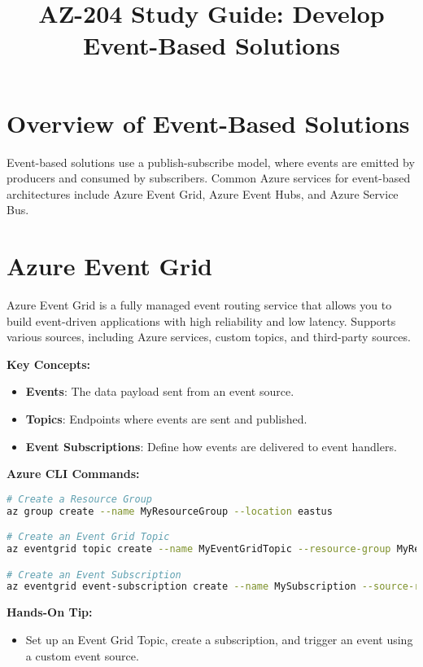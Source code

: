 \documentclass{article}
\title{AZ-204 Study Guide: Develop Event-Based Solutions}
\author{}
\date{}
\begin{document}
\maketitle

\section{Overview of Event-Based Solutions}
Event-based solutions use a publish-subscribe model, where events are emitted by producers and consumed by subscribers. Common Azure services for event-based architectures include Azure Event Grid, Azure Event Hubs, and Azure Service Bus.

\section{Azure Event Grid}
Azure Event Grid is a fully managed event routing service that allows you to build event-driven applications with high reliability and low latency. Supports various sources, including Azure services, custom topics, and third-party sources.

\textbf{Key Concepts:}
\begin{itemize}
    \item \textbf{Events}: The data payload sent from an event source.
    \item \textbf{Topics}: Endpoints where events are sent and published.
    \item \textbf{Event Subscriptions}: Define how events are delivered to event handlers.
\end{itemize}

\textbf{Azure CLI Commands:}
\begin{lstlisting}[language=bash]
# Create a Resource Group
az group create --name MyResourceGroup --location eastus

# Create an Event Grid Topic
az eventgrid topic create --name MyEventGridTopic --resource-group MyResourceGroup --location eastus

# Create an Event Subscription
az eventgrid event-subscription create --name MySubscription --source-resource-id /subscriptions/<subscription-id>/resourceGroups/MyResourceGroup/providers/Microsoft.EventGrid/topics/MyEventGridTopic --endpoint <endpoint-URL>
\end{lstlisting}

\textbf{Hands-On Tip:}
\begin{itemize}
    \item Set up an Event Grid Topic, create a subscription, and trigger an event using a custom event source.
\end{itemize}
\end{document}
